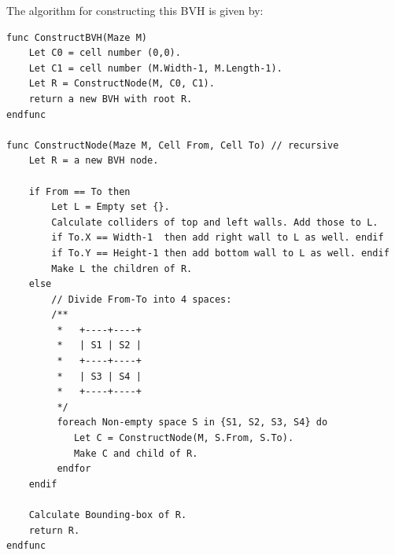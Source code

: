 The algorithm for constructing this BVH is given by:

\pagebreak
\lstAlgo
\begin{lstlisting}
func ConstructBVH(Maze M)
	Let C0 = cell number (0,0).
	Let C1 = cell number (M.Width-1, M.Length-1).
	Let R = ConstructNode(M, C0, C1).
	return a new BVH with root R.
endfunc

func ConstructNode(Maze M, Cell From, Cell To) // recursive
	Let R = a new BVH node.

	if From == To then
		Let L = Empty set {}.
		Calculate colliders of top and left walls. Add those to L.
		if To.X == Width-1  then add right wall to L as well. endif
		if To.Y == Height-1 then add bottom wall to L as well. endif
		Make L the children of R.
	else
		// Divide From-To into 4 spaces:
        /**
         *   +----+----+
         *   | S1 | S2 |
         *   +----+----+
         *   | S3 | S4 |
         *   +----+----+
         */
         foreach Non-empty space S in {S1, S2, S3, S4} do
         	Let C = ConstructNode(M, S.From, S.To).
         	Make C and child of R.
         endfor
	endif
	
	Calculate Bounding-box of R.
	return R.
endfunc
\end{lstlisting}